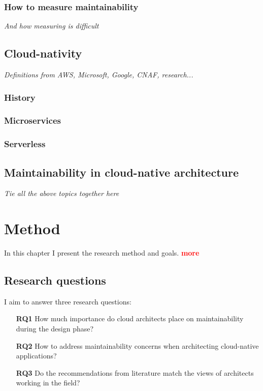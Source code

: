 \documentclass[utf8,english]{gradu3}
\newcommand{\todo}[1]{\textbf{\textcolor{red}{#1}}}
\newcommand{\tmp}[1]{\textit{{#1}}}
\begin{document}
\subsection{How to measure maintainability}

\tmp{And how measuring is difficult}

\section{Cloud-nativity}

\tmp{Definitions from AWS, Microsoft, Google, CNAF, research...}
\subsection{History}

\subsection{Microservices}

\subsection{Serverless}

\section{Maintainability in cloud-native architecture}
\tmp{Tie all the above topics together here}

\chapter{Method}

In this chapter I present the research method and goals. \todo{more}

\section{Research questions}

I aim to answer three research questions:
\begin{itemize}
  \item [\textbf{RQ1}] How much importance do cloud architects place on maintainability during
        the design phase?
  \item [\textbf{RQ2}] How to address maintainability concerns when architecting cloud-native
        applications?
  \item [\textbf{RQ3}] Do the recommendations from literature match the views of architects
        working in the field?
\end{itemize}
\end{document}
